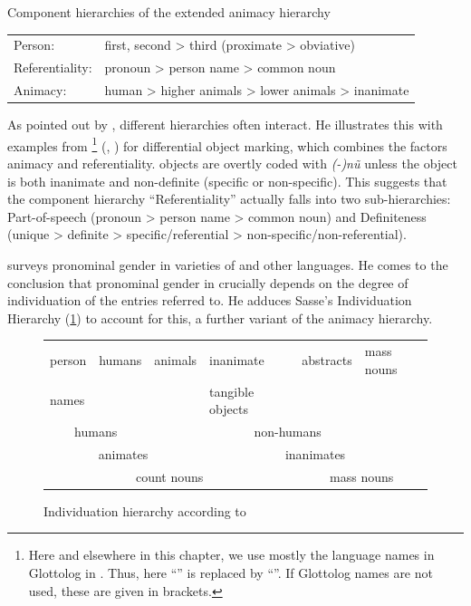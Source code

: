 \documentclass[output=collectionpaper]{langsci/langscibook}
\begin{document}
\ea\label{ex:WDG:3}
Component hierarchies of the extended animacy hierarchy\\
\begin{tabular}{ll}
Person:	& first, second > third (proximate > obviative)\\
Referentiality: &	pronoun > person name > common noun\\
Animacy:	& human > higher animals > lower animals > inanimate\\
\end{tabular}
\z

As pointed out by \cite[166]{Croft2003}, different hierarchies often interact. He illustrates this with examples from %
\footnote{%
Here and elsewhere in this chapter, we use mostly the language names in Glottolog in \cite{Hammarstroem2018}. Thus, here ``'' is replaced by ``''. If Glottolog names are not used, these are given in brackets.
} %
(, ) for differential object marking, which combines the factors animacy and referentiality.  objects are overtly coded with \textit{(-)nũ} unless the object is both inanimate and non-definite (specific or non-specific). This suggests that the component hierarchy ``Referentiality'' actually falls into two sub-hierarchies: Part-of-speech (pronoun > person name > common noun) and Definiteness (unique > definite > specific/referential > non-specific/non-referential).

\cite{Siemund2008} surveys pronominal gender in varieties of  and other languages. He comes to the conclusion that pronominal gender in  crucially depends on the degree of individuation of the entries referred to. He adduces Sasse's Individuation Hierarchy (\ref{fig:WDG:1}) to account for this, a further variant of the animacy hierarchy.

\begin{figure}[htb]
\begin{tabular}{|l|l|l|l|l|l|}
\hline person &	humans &	animals &	inanimate  &	abstracts	& mass nouns \\
names & & & tangible objects & & \\
\hline \multicolumn{2}{|c|}{humans} &	\multicolumn{4}{c|}{non-humans} \\
\hline \multicolumn{3}{|c|}{animates} &	\multicolumn{3}{c|}{inanimates} \\
\hline \multicolumn{4}{|c|}{count nouns} &	\multicolumn{2}{c|}{mass nouns} \\
\hline
\end{tabular}
\caption{Individuation hierarchy according to \cite[659]{Sasse1993}}
\label{fig:WDG:1}
\end{figure}
\end{document}
